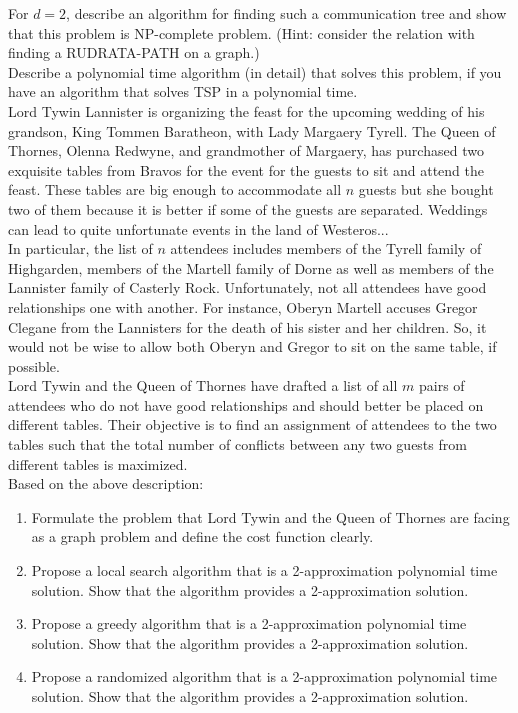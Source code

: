 \documentclass{article}
\begin{document}
 For $d = 2$, describe an algorithm for finding such
a communication tree and show that this problem is NP-complete
problem.  (Hint: consider the relation with finding a RUDRATA-PATH on
a graph.)\\

 Describe a polynomial time algorithm (in detail)
that solves this problem, if you have an algorithm that solves TSP in
a polynomial time. \\

 Lord Tywin Lannister is
organizing the feast for the upcoming wedding of his grandson, King
Tommen Baratheon, with Lady Margaery Tyrell. The Queen of Thornes,
Olenna Redwyne, and grandmother of Margaery, has purchased two
exquisite tables from Bravos for the event for the guests to sit and
attend the feast. These tables are big enough to accommodate all $n$
guests but she bought two of them because it is better if some of the
guests are separated. Weddings can lead to quite unfortunate events in
the land of Westeros...\\

\noindent In particular, the list of $n$ attendees includes members of
the Tyrell family of Highgarden, members of the Martell family of
Dorne as well as members of the Lannister family of Casterly
Rock. Unfortunately, not all attendees have good relationships one
with another. For instance, Oberyn Martell accuses Gregor Clegane from
the Lannisters for the death of his sister and her children. So, it
would not be wise to allow both Oberyn and Gregor to sit on the same
table, if possible.\\

\noindent Lord Tywin and the Queen of Thornes have drafted a list of
all $m$ pairs of attendees who do not have good relationships and
should better be placed on different tables. Their objective is to
find an assignment of attendees to the two tables such that the total
number of conflicts between any two guests from different tables is
maximized.\\

\noindent Based on the above description:

\begin{enumerate}
\item Formulate the problem that Lord Tywin and the Queen of Thornes
  are facing as a graph problem and define the cost function clearly.
\item Propose a local search algorithm that is a 2-approximation
  polynomial time solution. Show that the algorithm provides a
  2-approximation solution.
\item Propose a greedy algorithm that is a  2-approximation
  polynomial time solution. Show that the algorithm provides a
  2-approximation solution.
\item Propose a randomized algorithm that is a 2-approximation
  polynomial time solution. Show that the algorithm provides a
  2-approximation solution.
\end{enumerate}
\end{document}

